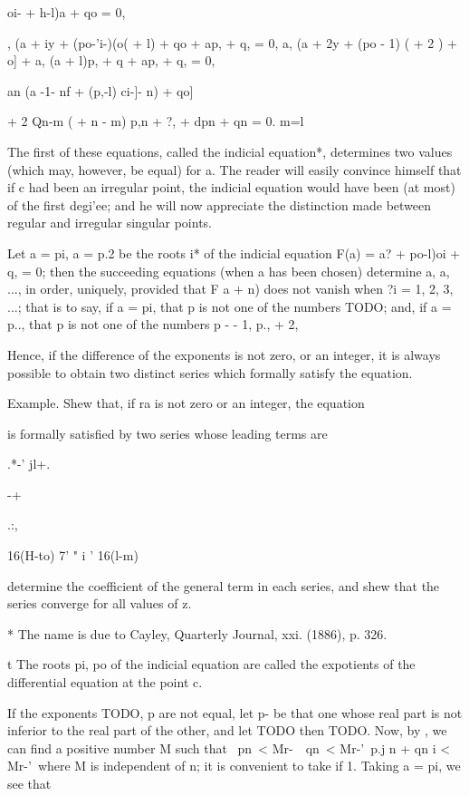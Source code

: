 oi- + h-l)a + qo = 0,

, (a + iy + (po-'i-)(o( + l) + qo + ap, + q, = 0, a, (a + 2y + (po -
1) ( + 2 ) + o] + a, (a + l)p, + q + ap, + q, = 0,

an (a -1- nf + (p,-l) ci-]- n) + qo]

+ 2 Qn-m ( + n - m) p,n + ?, + dpn + qn = 0. m=l

The first of these equations, called the indicial equation*,
determines two values (which may, however, be equal) for a. The reader
will easily convince himself that if c had been an irregular point,
the indicial equation would have been (at most) of the first degi'ee;
and he will now appreciate the distinction made between regular and
irregular singular points.

Let a = pi, a = p.2 be the roots i* of the indicial equation F(a) = a?
+ po-l)oi + q, = 0; then the succeeding equations (when a has been
chosen) determine a, a, ..., in order, uniquely, provided that F a +
n) does not vanish when ?i = 1, 2, 3, ...; that is to say, if a = pi,
that p is not one of the numbers TODO; and, if a =
p.., that p is not one of the numbers p - - 1, p., + 2,

Hence, if the difference of the exponents is not zero, or an integer,
it is always possible to obtain two distinct series which formally
satisfy the equation.

Example. Shew that, if ra is not zero or an integer, the equation

is formally satisfied by two series whose leading terms are

.*-' jl+.

-+

.:,

16(H-to) 7' " i ' 16(l-m)

determine the coefficient of the general term in each series, and shew
that the series converge for all values of z.

* The name is due to Cayley, Quarterly Journal, xxi. (1886), p. 326.

t The roots pi, po of the indicial equation are called the expotients
of the differential equation at the point c.

%
%


If the exponents TODO, p are not equal, let p- be that one whose real
part is not inferior to the real part of the other, and let
TODO
then
TODO.
Now, by , we can find a positive number M
such that \ pn\ < Mr-\ \ qn\ < Mr-'\ p.j n + qn i < Mr-'\ where M is
independent of n; it is convenient to take if 1. Taking a = pi, we
see that

